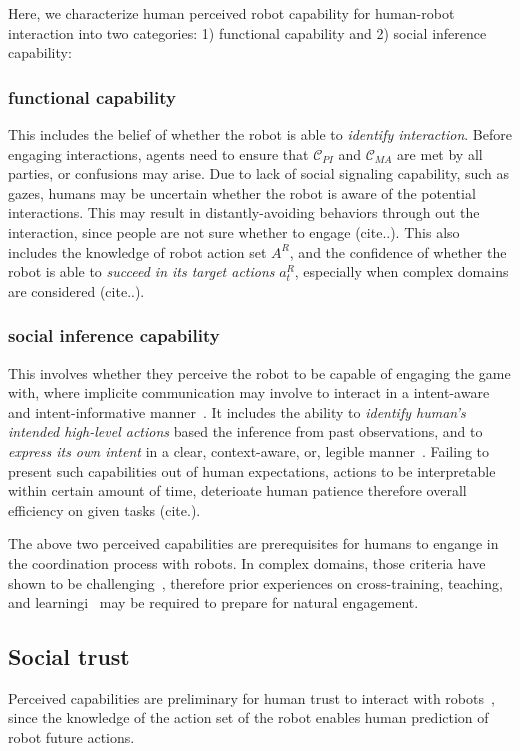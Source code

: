 \documentclass[letterpaper, 10 pt, conference]{ieeeconf}  %
\begin{document}
Here, we characterize human perceived robot capability for human-robot interaction into two categories: 1) functional capability and 2) social inference capability:

\subsubsection{functional capability}
This includes the belief of whether the robot is able to \textit{identify 
interaction}. Before engaging interactions, agents need to ensure that 
$\mathcal{C}_{PI}$ and $\mathcal{C}_{MA}$ are met by all parties, or 
confusions may arise. Due to lack of social signaling capability, such as gazes, 
humans may be uncertain whether the robot is aware of the potential 
interactions. This may result in distantly-avoiding behaviors through out the interaction, since 
people are not sure whether to engage (cite..).
This also includes the knowledge of robot action set $A^R$, and the confidence of 
whether the robot is able to \textit{succeed in its target actions} $a^R_t$, 
especially when complex domains are considered (cite..). 

\subsubsection{social inference capability}
This involves whether they perceive the robot to be capable of engaging the 
game with, where implicite communication may involve to interact in a intent-aware and intent-informative manner~\cite{knepper2017implicit}. It 
includes the ability to
\textit{identify human's intended high-level actions} based the inference from 
past observations, and to \textit{express its own intent} in a clear, 
context-aware, or, legible manner~\cite{dragan2013legibility}. Failing to 
present such capabilities out of human expectations, actions to 
be interpretable within certain amount of time, deterioate human patience 
therefore overall efficiency on given tasks (cite.). 

The above two perceived capabilities are prerequisites for humans to engange in the 
coordination process with robots. In complex domains, those criteria have shown to be 
challenging~\cite{knepper2017implicit}, therefore prior experiences on 
cross-training, teaching, and learningi~\cite{zhang2017} may be required 
to prepare for natural engagement. 
\subsection{Social trust}%
Perceived capabilities are preliminary for human trust to interact with 
robots~\cite{yang2017evaluating}, since the knowledge of the action set of the robot enables 
human prediction of robot future actions.
\end{document}
